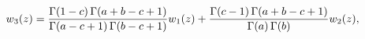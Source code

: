 \[w_{3}(z)=\frac{\mathop{\Gamma\/}\nolimits\!\left(1-c\right)\mathop{\Gamma\/}%
\nolimits\!\left(a+b-c+1\right)}{\mathop{\Gamma\/}\nolimits\!\left(a-c+1\right%
)\mathop{\Gamma\/}\nolimits\!\left(b-c+1\right)}w_{1}(z)+\frac{\mathop{\Gamma%
\/}\nolimits\!\left(c-1\right)\mathop{\Gamma\/}\nolimits\!\left(a+b-c+1\right)%
}{\mathop{\Gamma\/}\nolimits\!\left(a\right)\mathop{\Gamma\/}\nolimits\!\left(%
b\right)}w_{2}(z),\]